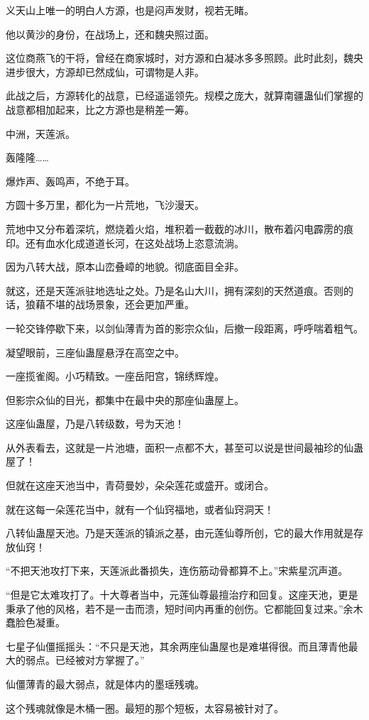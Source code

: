 \begin{this_body}
义天山上唯一的明白人方源，也是闷声发财，视若无睹。

他以黄沙的身份，在战场上，还和魏央照过面。

这位商燕飞的干将，曾经在商家城时，对方源和白凝冰多多照顾。此时此刻，魏央进步很大，方源却已然成仙，可谓物是人非。

此战之后，方源转化的战意，已经遥遥领先。规模之庞大，就算南疆蛊仙们掌握的战意都相加起来，比之方源也是稍差一筹。

中洲，天莲派。

轰隆隆……

爆炸声、轰鸣声，不绝于耳。

方圆十多万里，都化为一片荒地，飞沙漫天。

荒地中又分布着深坑，燃烧着火焰，堆积着一截截的冰川，散布着闪电霹雳的痕印。还有血水化成道道长河，在这处战场上恣意流淌。

因为八转大战，原本山峦叠嶂的地貌。彻底面目全非。

就这，还是天莲派驻地选址之处。乃是名山大川，拥有深刻的天然道痕。否则的话，狼藉不堪的战场景象，还会更加严重。

一轮交锋停歇下来，以剑仙薄青为首的影宗众仙，后撤一段距离，呼呼喘着粗气。

凝望眼前，三座仙蛊屋悬浮在高空之中。

一座揽雀阁。小巧精致。一座岳阳宫，锦绣辉煌。

但影宗众仙的目光，都集中在最中央的那座仙蛊屋上。

这座仙蛊屋，乃是八转级数，号为天池！

从外表看去，这就是一片池塘，面积一点都不大，甚至可以说是世间最袖珍的仙蛊屋了！

但就在这座天池当中，青荷曼妙，朵朵莲花或盛开。或闭合。

就在这每一朵莲花当中，就有一个仙窍福地，或者仙窍洞天！

八转仙蛊屋天池。乃是天莲派的镇派之基，由元莲仙尊所创，它的最大作用就是存放仙窍！

“不把天池攻打下来，天莲派此番损失，连伤筋动骨都算不上。”宋紫星沉声道。

“但是它太难攻打了。十大尊者当中，元莲仙尊最擅治疗和回复。这座天池，更是秉承了他的风格，若不是一击而溃，短时间内再重的创伤。它都能回复过来。”余木蠢脸色凝重。

七星子仙僵摇摇头：“不只是天池，其余两座仙蛊屋也是难堪得很。而且薄青他最大的弱点。已经被对方掌握了。”

仙僵薄青的最大弱点，就是体内的墨瑶残魂。

这个残魂就像是木桶一圈。最短的那个短板，太容易被针对了。


\end{this_body}
